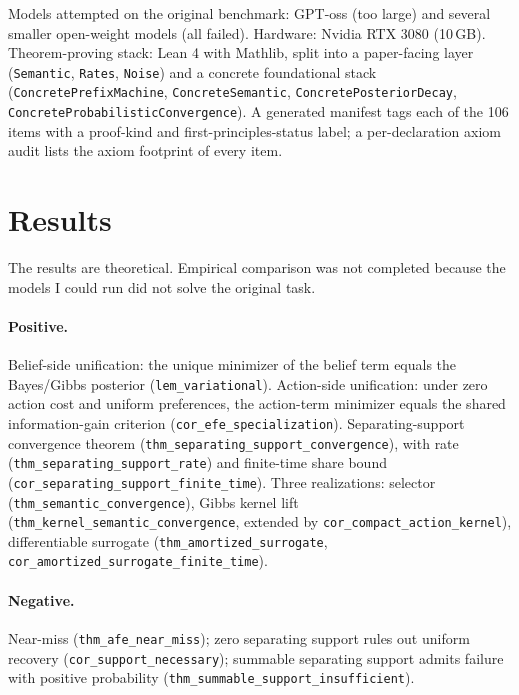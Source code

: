 \documentclass[11pt]{article}
\begin{document}
Models attempted on the original benchmark: GPT-oss (too large) and several smaller open-weight models (all failed). Hardware: Nvidia RTX 3080 (10\,GB). Theorem-proving stack: Lean 4 with Mathlib, split into a paper-facing layer (\texttt{Semantic}, \texttt{Rates}, \texttt{Noise}) and a concrete foundational stack (\texttt{ConcretePrefixMachine}, \texttt{ConcreteSemantic}, \texttt{ConcretePosteriorDecay}, \texttt{ConcreteProbabilisticConvergence}). A generated manifest tags each of the 106 items with a proof-kind and first-principles-status label; a per-declaration axiom audit lists the axiom footprint of every item.

\section{Results}

The results are theoretical. Empirical comparison was not completed because the models I could run did not solve the original task.

\paragraph{Positive.} Belief-side unification: the unique minimizer of the belief term equals the Bayes/Gibbs posterior (\texttt{lem\_variational}). Action-side unification: under zero action cost and uniform preferences, the action-term minimizer equals the shared information-gain criterion (\texttt{cor\_efe\_specialization}). Separating-support convergence theorem (\texttt{thm\_separating\_support\_convergence}), with rate (\texttt{thm\_separating\_support\_rate}) and finite-time share bound (\texttt{cor\_separating\_support\_finite\_time}). Three realizations: selector (\texttt{thm\_semantic\_convergence}), Gibbs kernel lift (\texttt{thm\_kernel\_semantic\_convergence}, extended by \texttt{cor\_compact\_action\_kernel}), differentiable surrogate (\texttt{thm\_amortized\_surrogate}, \texttt{cor\_amortized\_surrogate\_finite\_time}).

\paragraph{Negative.} Near-miss (\texttt{thm\_afe\_near\_miss}); zero separating support rules out uniform recovery (\texttt{cor\_support\_necessary}); summable separating support admits failure with positive probability (\texttt{thm\_summable\_support\_insufficient}).
\end{document}
